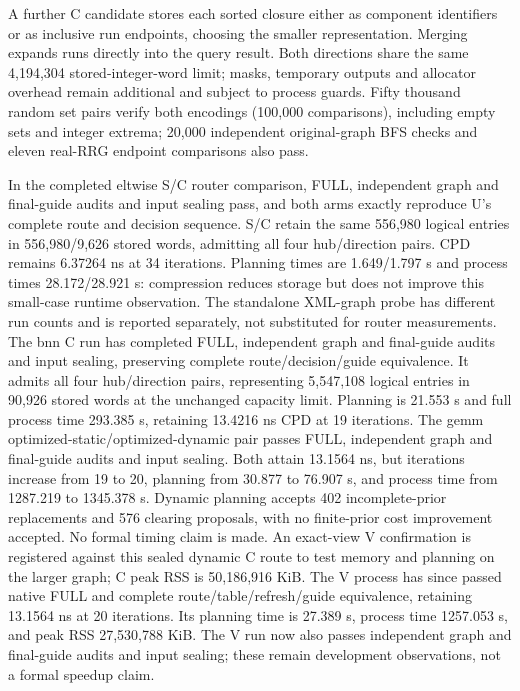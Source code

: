 \documentclass[conference,10pt]{IEEEtran}
\begin{document}
A further C candidate stores each sorted closure either as component identifiers or as inclusive run endpoints, choosing the smaller representation. Merging expands runs directly into the query result. Both directions share the same 4,194,304 stored-integer-word limit; masks, temporary outputs and allocator overhead remain additional and subject to process guards. Fifty thousand random set pairs verify both encodings (100,000 comparisons), including empty sets and integer extrema; 20,000 independent original-graph BFS checks and eleven real-RRG endpoint comparisons also pass.

In the completed eltwise S/C router comparison, FULL, independent graph and final-guide audits and input sealing pass, and both arms exactly reproduce U's complete route and decision sequence. S/C retain the same 556,980 logical entries in 556,980/9,626 stored words, admitting all four hub/direction pairs. CPD remains 6.37264 ns at 34 iterations. Planning times are 1.649/1.797 s and process times 28.172/28.921 s: compression reduces storage but does not improve this small-case runtime observation. The standalone XML-graph probe has different run counts and is reported separately, not substituted for router measurements. The bnn C run has completed FULL, independent graph and final-guide audits and input sealing, preserving complete route/decision/guide equivalence. It admits all four hub/direction pairs, representing 5,547,108 logical entries in 90,926 stored words at the unchanged capacity limit. Planning is 21.553 s and full process time 293.385 s, retaining 13.4216 ns CPD at 19 iterations. The gemm optimized-static/optimized-dynamic pair passes FULL, independent graph and final-guide audits and input sealing. Both attain 13.1564 ns, but iterations increase from 19 to 20, planning from 30.877 to 76.907 s, and process time from 1287.219 to 1345.378 s. Dynamic planning accepts 402 incomplete-prior replacements and 576 clearing proposals, with no finite-prior cost improvement accepted. No formal timing claim is made. An exact-view V confirmation is registered against this sealed dynamic C route to test memory and planning on the larger graph; C peak RSS is 50,186,916 KiB. The V process has since passed native FULL and complete route/table/refresh/guide equivalence, retaining 13.1564 ns at 20 iterations. Its planning time is 27.389 s, process time 1257.053 s, and peak RSS 27,530,788 KiB. The V run now also passes independent graph and final-guide audits and input sealing; these remain development observations, not a formal speedup claim.
\end{document}
